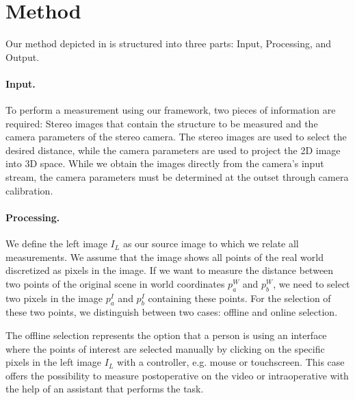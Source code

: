 \documentclass[letterpaper]{article} %
\begin{document}
\section{Method}

Our method depicted in  is structured into three parts: Input, Processing, and Output.


\paragraph{Input.} To perform a measurement using our framework, two pieces of information are required: Stereo images that contain the structure to be measured and the camera parameters of the stereo camera. The stereo images are used to select the desired distance, while the camera parameters are used to project the 2D image into 3D space. While we obtain the images directly from the camera's input stream, the camera parameters must be determined at the outset through camera calibration.

\paragraph{Processing.} We define the left image $I_L$ as our source image to which we relate all measurements. We assume that the image shows all points of the real world discretized as pixels in the image. If we want to measure the distance between two points of the original scene in world coordinates $p_a^{W}$ and $p_b^{W}$, we need to select two pixels in the image $p_a^{I}$ and $p_b^{I}$ containing these points. For the selection of these two points, we distinguish between two cases: offline and online selection.

The offline selection represents the option that a person is using an interface where the points of interest are selected manually by clicking on the specific pixels in the left image $I_L$ with a controller, e.g. mouse or touchscreen. This case offers the possibility to measure postoperative on the video or intraoperative with the help of an assistant that performs the task.
\end{document}
